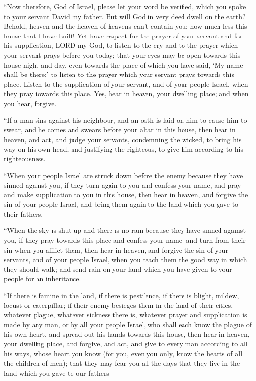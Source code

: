  ``Now therefore, God of Israel, please let your word be
verified, which you spoke to your servant David my father.
 But will God in very deed dwell on the earth? Behold,
heaven and the heaven of heavens can't contain you; how much less this
house that I have built!  Yet have respect for the prayer
of your servant and for his supplication, LORD my God, to listen to the
cry and to the prayer which your servant prays before you today;
 that your eyes may be open towards this house night and
day, even towards the place of which you have said, `My name shall be
there;' to listen to the prayer which your servant prays towards this
place.  Listen to the supplication of your servant, and
of your people Israel, when they pray towards this place. Yes, hear in
heaven, your dwelling place; and when you hear, forgive.

 ``If a man sins against his neighbour, and an oath is
laid on him to cause him to swear, and he comes and swears before your
altar in this house,  then hear in heaven, and act, and
judge your servants, condemning the wicked, to bring his way on his own
head, and justifying the righteous, to give him according to his
righteousness.

 ``When your people Israel are struck down before the
enemy because they have sinned against you, if they turn again to you
and confess your name, and pray and make supplication to you in this
house,  then hear in heaven, and forgive the sin of your
people Israel, and bring them again to the land which you gave to their
fathers.

 ``When the sky is shut up and there is no rain because
they have sinned against you, if they pray towards this place and
confess your name, and turn from their sin when you afflict them,
 then hear in heaven, and forgive the sin of your
servants, and of your people Israel, when you teach them the good way in
which they should walk; and send rain on your land which you have given
to your people for an inheritance.

 ``If there is famine in the land, if there is
pestilence, if there is blight, mildew, locust or caterpillar; if their
enemy besieges them in the land of their cities, whatever plague,
whatever sickness there is,  whatever prayer and
supplication is made by any man, or by all your people Israel, who shall
each know the plague of his own heart, and spread out his hands towards
this house,  then hear in heaven, your dwelling place,
and forgive, and act, and give to every man according to all his ways,
whose heart you know (for you, even you only, know the hearts of all the
children of men);  that they may fear you all the days
that they live in the land which you gave to our fathers.

